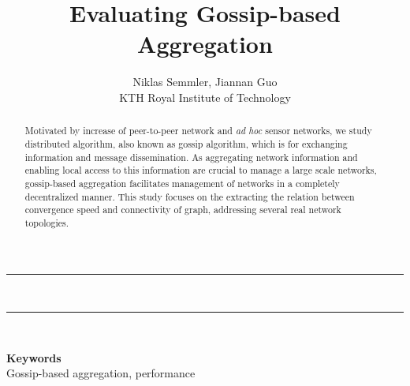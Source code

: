 \documentclass[11pt,a4paper]{article}
\date{}
\def\keywords#1{\begin{center}{\bf Keywords}\\{#1}\end{center}} %
\def\titulo#1{\title{#1}} %
\def\autores#1{\author{#1}} %
\begin{document}
\titulo{Evaluating Gossip-based Aggregation}
%
\autores{
Niklas Semmler, Jiannan Guo\\
KTH Royal Institute of Technology\\
}%
%
\maketitle
\newcommand{\HRule}{\rule{\linewidth}{0.5mm}}
\HRule \\[0.4cm]
\begin{abstract}
Motivated by increase of peer-to-peer network and {\it ad hoc} sensor networks, we study distributed algorithm, also known as gossip algorithm, which is for exchanging information and message dissemination. As aggregating network information and enabling local access to this information are crucial to manage a large scale networks, gossip-based aggregation facilitates management of networks in a completely decentralized manner. This study focuses on the extracting the relation between convergence speed and connectivity of graph, addressing several real network topologies.
\end{abstract}
\HRule \\[0.4cm]

\keywords{Gossip-based aggregation, performance}%

\cite{entropy2}












\appendix
\end{document}

